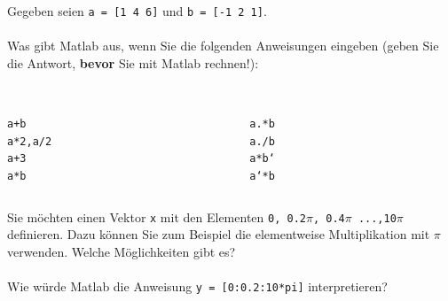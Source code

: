     \secMexercise
    \begin{frame}
      \frameMexercise
      \begin{exercise}
          \sloppy
          Gegeben seien \texttt{a = [1 4 6]} und \texttt{b = [-1 2 1]}.\\ \\

          Was gibt Matlab aus, wenn Sie die folgenden Anweisungen eingeben (geben Sie die Antwort, \textbf{bevor} Sie mit Matlab rechnen!):\\ \\

          \begin{columns}[t]
            \begin{column}{5cm}
                \texttt{a+b} \keys{\return} \\
                \texttt{a*2,a/2} \keys{\return}  \\
                \texttt{a+3} \keys{\return}  \\
                \texttt{a*b} \keys{\return}  \\
            \end{column}

            \begin{column}{5cm}
                \texttt{a.*b} \keys{\return}  \\
                \texttt{a./b} \keys{\return}  \\
                \texttt{a*b`} \keys{\return}  \\
                \texttt{a`*b} \keys{\return}  \\
            \end{column}
          \end{columns}


      \end{exercise}
    \end{frame}

    \secMexercise
    \begin{frame}
      \frameMexercise
      \begin{exercise}
          \sloppy
          Sie möchten einen Vektor \texttt{x} mit den Elementen \texttt{0, 0.2$\pi$, 0.4$\pi$ ...,10$\pi$} definieren.
          Dazu können Sie zum Beispiel die elementweise Multiplikation mit \texttt{$\pi$} verwenden. Welche Möglichkeiten gibt es? \\ \\

          Wie würde Matlab die Anweisung \texttt{y = [0:0.2:10*pi]} interpretieren?
      \end{exercise}
    \end{frame}

